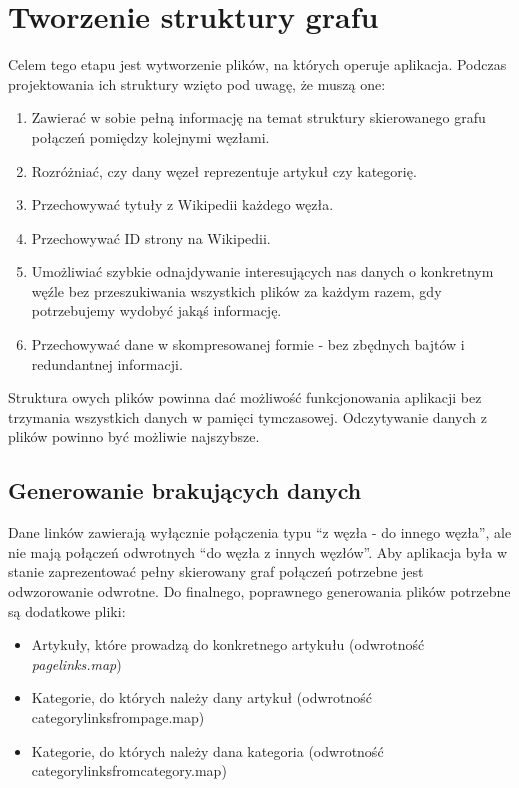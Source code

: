 \section{Tworzenie struktury grafu}
\label{sec:data-files}
Celem tego etapu jest wytworzenie plików, na których operuje aplikacja. Podczas projektowania ich struktury wzięto pod uwagę, że muszą one:
\begin{enumerate}
    \item Zawierać w sobie pełną informację na temat struktury skierowanego grafu połączeń pomiędzy kolejnymi węzłami.
    \item Rozróżniać, czy dany węzeł reprezentuje artykuł czy kategorię.
    \item Przechowywać tytuły z Wikipedii każdego węzła.
    \item Przechowywać ID strony na Wikipedii.
    \item Umożliwiać szybkie odnajdywanie interesujących nas danych o konkretnym węźle bez przeszukiwania wszystkich plików za każdym razem, gdy potrzebujemy wydobyć jakąś informację.
    \item Przechowywać dane w skompresowanej formie - bez zbędnych bajtów i redundantnej informacji.
\end{enumerate}

Struktura owych plików powinna dać możliwość funkcjonowania aplikacji bez trzymania wszystkich danych w pamięci tymczasowej. Odczytywanie danych z plików powinno być możliwie najszybsze.

\subsection{Generowanie brakujących danych}
\label{sec:generating-missing-files}

Dane linków zawierają wyłącznie połączenia typu ``z węzła - do innego węzła'', ale nie mają połączeń odwrotnych ``do węzła z innych węzłów''. Aby aplikacja była w stanie zaprezentować pełny skierowany graf połączeń potrzebne jest odwzorowanie odwrotne.
Do finalnego, poprawnego generowania plików potrzebne są dodatkowe pliki:
\begin{itemize}
    \item Artykuły, które prowadzą do konkretnego artykułu (odwrotność \textit{pagelinks.map})
    \item Kategorie, do których należy dany artykuł (odwrotność categorylinksfrompage.map)
    \item Kategorie, do których należy dana kategoria (odwrotność categorylinksfromcategory.map)
\end{itemize}

